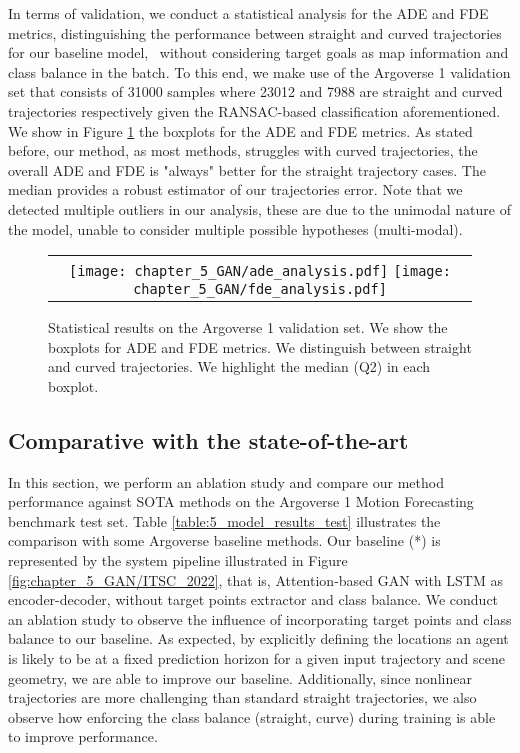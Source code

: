 In terms of validation, we conduct a statistical analysis for the ADE and FDE metrics, distinguishing the performance between straight and curved trajectories for our baseline model, \ie \ without considering target goals as map information and class balance in the batch. To this end, we make use of the Argoverse 1 validation set that consists of 31000 samples where 23012 and 7988 are straight and curved trajectories respectively given the RANSAC-based classification aforementioned. We show in Figure \ref{fig:chapter_5_GAN/boxplots} the boxplots for the ADE and FDE metrics. As stated before, our method, as most methods, struggles with curved trajectories, the overall ADE and FDE is "always" better for the straight trajectory cases. The median provides a robust estimator of our trajectories error. Note that we detected multiple outliers in our analysis, these are due to the unimodal nature of the model, unable to consider multiple possible hypotheses (multi-modal). 

\begin{figure}[!ht]
	\centering
	\setlength{\tabcolsep}{2.0pt}
	\begin{tabular}{c}
		\texttt{[image: chapter\_5\_GAN/ade\_analysis.pdf]} %
		\texttt{[image: chapter\_5\_GAN/fde\_analysis.pdf]}\tabularnewline
	\end{tabular}
	\caption{Statistical results on the Argoverse 1 validation set. We show the boxplots for ADE and FDE metrics. We distinguish between straight and curved trajectories. We highlight the median (Q2) in each boxplot.}
	\label{fig:chapter_5_GAN/boxplots}
\end{figure}

\subsection{Comparative with the state-of-the-art}
\label{subsec:5_model_results}

In this section, we perform an ablation study and compare our method performance against \ac{SOTA} methods on the Argoverse 1 Motion Forecasting benchmark test set. Table \ref{table:5_model_results_test} illustrates the comparison with some Argoverse baseline methods. Our baseline (*) is represented by the system pipeline illustrated in Figure \ref{fig:chapter_5_GAN/ITSC_2022}, that is, Attention-based \ac{GAN} with \ac{LSTM} as encoder-decoder, without target points extractor and class balance. We conduct an ablation study to observe the influence of incorporating target points and class balance to our baseline. As expected, by explicitly defining the locations an agent is likely to be at a fixed prediction horizon for a given input trajectory and scene geometry, we are able to improve our baseline. Additionally, since nonlinear trajectories are more challenging than standard straight trajectories, we also observe how enforcing the class balance (straight, curve) during training is able to improve performance.

